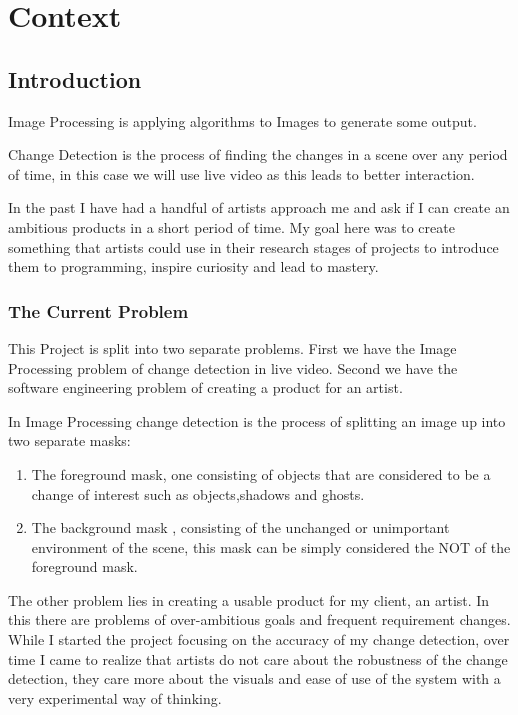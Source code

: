 \documentclass[a4paper]{report}
\begin{document}
\tableofcontents
\clearpage

\chapter{Context}
\section{Introduction}
Image Processing is applying algorithms to Images to generate some output.

Change Detection is the process of finding the changes in a scene over any period of time, in this case we will use live video as this leads to better interaction.

In the past I have had a handful of artists approach me and ask if I can create an ambitious products in a short period of time. My goal here was to create something that artists could use in their research stages of projects to introduce them to programming, inspire curiosity and lead to mastery.

\subsection{The Current Problem}
This Project is split into two separate problems. First we have the Image Processing problem of change detection in live video. Second we have the software engineering problem of creating a product for an artist.

In Image Processing change detection is the process of splitting an image up into two separate masks:
\begin{enumerate}
  \item The foreground mask, one consisting of objects that are considered to be a change of interest such as objects,shadows and ghosts.
  \item The background mask , consisting of the unchanged or unimportant environment of the scene, this mask can be simply considered the NOT of the foreground mask.
\end{enumerate}

The other problem lies in creating a usable product for my client, an artist. In this there are problems of over-ambitious goals and frequent requirement changes. While I started the project focusing on the accuracy of my change detection, over time I came to realize that artists do not care about the robustness of the change detection, they care more about the visuals and ease of use of the system with a very experimental way of thinking.
\end{document}
